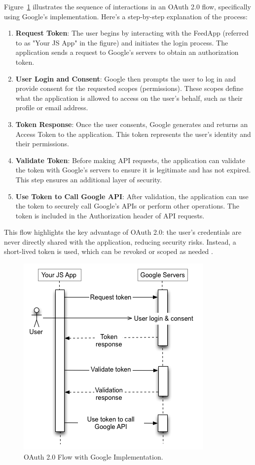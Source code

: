 Figure~\ref{fig:oauth2-google} illustrates the sequence of interactions in an OAuth 2.0 flow, specifically using Google's implementation. Here's a step-by-step explanation of the process:
\begin{enumerate}
\item \textbf{Request Token}:
The user begins by interacting with the FeedApp (referred to as "Your JS App" in the figure) and initiates the login process. The application sends a request to Google’s servers to obtain an authorization token.

\item \textbf{User Login and Consent}:
Google then prompts the user to log in and provide consent for the requested scopes (permissions). These scopes define what the application is allowed to access on the user's behalf, such as their profile or email address.

\item \textbf{Token Response}:
Once the user consents, Google generates and returns an Access Token to the application. This token represents the user’s identity and their permissions.

\item \textbf{Validate Token}:
Before making API requests, the application can validate the token with Google’s servers to ensure it is legitimate and has not expired. This step ensures an additional layer of security.

\item \textbf{Use Token to Call Google API}:
After validation, the application can use the token to securely call Google’s APIs or perform other operations. The token is included in the Authorization header of API requests.
\end{enumerate}

This flow highlights the key advantage of OAuth 2.0: the user's credentials are never directly shared with the application, reducing security risks. Instead, a short-lived token is used, which can be revoked or scoped as needed \cite{google:oauth}.

\begin{figure}[htbp]
\centering
\includegraphics[scale=0.5]{figs/OAuthGoogle.png}
\caption{OAuth 2.0 Flow with Google Implementation.}
\label{fig:oauth2-google}
\end{figure}

